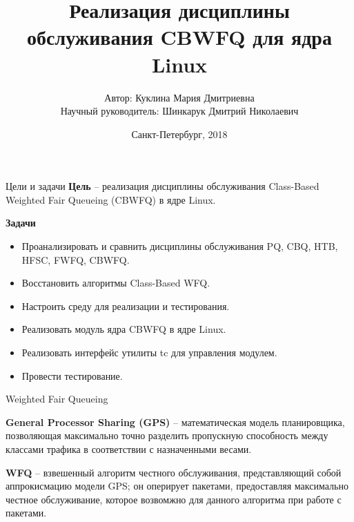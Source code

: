 \documentclass[12pt]{beamer}
\title[Реализация CBWFQ в ядре Linux]{Реализация дисциплины обслуживания CBWFQ для ядра Linux}
\author[]{{\small Автор: Куклина Мария Дмитриевна\\ Научный руководитель: Шинкарук Дмитрий Николаевич}}
\institute[]{Университет ИТМО}
\date[]{Санкт-Петербург, 2018}
\begin{document}
\setcounter{figure}{0}

\newcommand{\mc}[0]{\makecell}
\newcommand\setrow[1]{\gdef\rowmac{#1}#1\ignorespaces}
\newcommand\clearrow{\global\let\rowmac\relax}
\clearrow

\begin{darkbars}
    \begin{frame}
        \titlepage
    \end{frame}
\end{darkbars}

\begin{frame}{Цели и задачи}
    \textbf{Цель} -- реализация дисциплины обслуживания Class-Based Weighted Fair Queueing
    (CBWFQ) в ядре Linux. \newline

    \textbf{Задачи}
    {\small
        \begin{itemize}

    \item Проанализировать и сравнить дисциплины обслуживания PQ, CBQ, HTB, HFSC, FWFQ, CBWFQ.
    \item Восстановить алгоритмы Class-Based WFQ.
    \item Настроить среду для реализации и тестирования.
    \item Реализовать модуль ядра CBWFQ в ядре Linux.
    \item Реализовать интерфейс утилиты tc для управления модулем.
    \item Провести тестирование.
        \end{itemize}
    }
\end{frame}

\begin{frame}{Weighted Fair Queueing}
	
	\textbf{General Processor Sharing (GPS)} -- математическая модель
	планировщика, позволяющая максимально точно разделить пропускную
	способность между классами трафика в соответствии с назначенными
	весами.

	\textbf{WFQ} -- взвешенный алгоритм честного обслуживания,
	представляющий собой аппрокисмацию модели GPS; он оперирует
	пакетами, предоставляя максимально честное обслуживание,
	которое возвомжно для данного алгоритма при работе с пакетами.

\end{frame}
\end{document}
